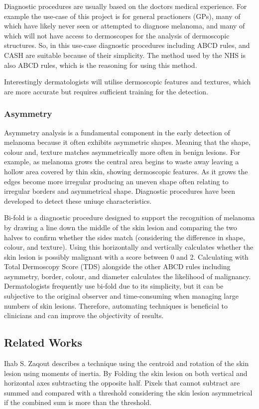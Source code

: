 Diagnostic procedures are usually based on the doctors medical experience. For example the use-case of this project is for general practioners (GPs), many of which have likely never seen or attempted to diagnose melanoma, and many of which will not have access to dermoscopes for the analysis of dermoscopic structures. So, in this use-case diagnostic procedures including ABCD rules, and CASH are suitable because of their simplicity. The method used by the NHS is also ABCD rules, which is the reasoning for using this method. 

Interestingly dermatologists will utilise dermoscopic features and textures, which are more accurate but requires sufficient training for the detection.

\subsubsection{Asymmetry}
Asymmetry analysis is a fundamental component in the early detection of melanoma because it often exhibits asymmetric shapes\cite{Ali2020a}. Meaning that the shape, colour and, texture matches asymmetrically more often in benign lesions. For example, as melanoma grows the central area begins to waste away leaving a hollow area covered by thin skin, showing dermoscopic features. As it grows the edges become more irregular producing an uneven shape often relating to irregular borders and asymmetrical shape. Diagnostic procedures have been developed to detect these uniuqe characteristics.

Bi-fold is a diagnostic procedure designed to support the recognition of melanoma by drawing a line down the middle of the skin lesion and comparing the two halves to confirm whether the sides match (considering the difference in shape, colour, and texture). Using this horizontally and vertically calculates whether the skin lesion is possibly malignant with a score between 0 and 2. Calculating with Total Dermoscopy Score (TDS) alongside the other ABCD rules including asymmetry, border, colour, and diameter calculates the likelihood of malignancy. Dermatologists frequently use bi-fold due to its simplicity, but it can be subjective to the original observer and time-consuming when managing large numbers of skin lesions. Therefore, automating techniques is beneficial to clinicians and can improve the objectivity of results.

\subsection{Related Works}
Ihab S. Zaqout\cite{Zaqout2016} describes a technique using the centroid and rotation of the skin lesion using moments of inertia. By Folding the skin lesion on both vertical and horizontal axes subtracting the opposite half. Pixels that cannot subtract are summed and compared with a threshold considering the skin lesion asymmetrical if the combined sum is more than the threshold.

